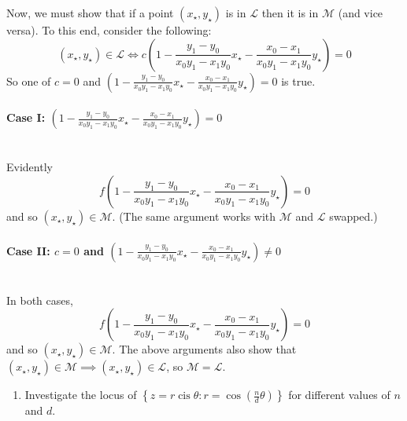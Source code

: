 \documentclass[a4paper,10pt]{article}
\DeclareMathOperator{\cis}{cis}
\newcommand{\answer}{\bfseries\color{Emerald}\refstepcounter{enumi}\item[\theenumi.]}
\begin{document}
Now, we must show that if a point $ (x_\star, y_\star) $ is in $ \mathcal{L} $ then it is in $ \mathcal{M} $ (and vice versa).
To this end, consider the following:
\begin{displaymath}
  (x_\star, y_\star) \in \mathcal{L} \iff c \left(1 - \frac{y_1 - y_0}{x_0 y_1 - x_1 y_0} x_\star - \frac{x_0 - x_1}{x_0 y_1 - x_1 y_0} y_\star \right) = 0
\end{displaymath}
So one of $ c = 0 $ and $ \left(1 - \frac{y_1 - y_0}{x_0 y_1 - x_1 y_0} x_\star - \frac{x_0 - x_1}{x_0 y_1 - x_1 y_0} y_\star \right) = 0 $ is true.

\paragraph{Case I: $ \left(1 - \frac{y_1 - y_0}{x_0 y_1 - x_1 y_0} x_\star - \frac{x_0 - x_1}{x_0 y_1 - x_1 y_0} y_\star \right) = 0 $}\mbox{}\\
Evidently
\begin{displaymath}
  f \left(1 - \frac{y_1 - y_0}{x_0 y_1 - x_1 y_0} x_\star - \frac{x_0 - x_1}{x_0 y_1 - x_1 y_0} y_\star \right) = 0
\end{displaymath}
and so $ (x_\star, y_\star) \in \mathcal{M} $. (The same argument works with $ \mathcal{M} $ and $ \mathcal{L} $ swapped.)

\paragraph{Case II: $ c = 0 $ and $ \left(1 - \frac{y_1 - y_0}{x_0 y_1 - x_1 y_0} x_\star - \frac{x_0 - x_1}{x_0 y_1 - x_1 y_0} y_\star \right) \neq 0 $}\mbox{}\\
In both cases,
\begin{displaymath}
  f \left(1 - \frac{y_1 - y_0}{x_0 y_1 - x_1 y_0} x_\star - \frac{x_0 - x_1}{x_0 y_1 - x_1 y_0} y_\star \right) = 0
\end{displaymath}
and so $ (x_\star, y_\star) \in \mathcal{M} $. The above arguments also show that $ (x_\star, y_\star) \in \mathcal{M} \implies (x_\star, y_\star) \in \mathcal{L} $,
so $ \mathcal{M} = \mathcal{L} $.

\filbreak\begin{enumerate}[resume]
  \answer Investigate the locus of $ \left\{z = r\cis\theta : r = \cos\left(\frac{n}{d}\theta\right)\right\} $ for different values of $ n $
        and $ d $.
\end{enumerate}
\end{document}
